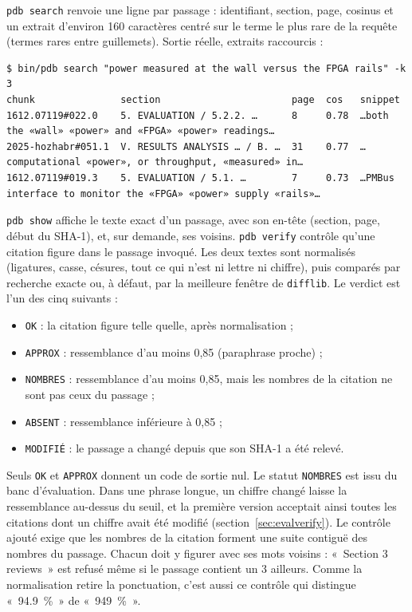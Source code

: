 \documentclass[11pt,a4paper]{article}
\newcommand{\cmd}[1]{\texttt{#1}}
\begin{document}
\cmd{pdb search} renvoie une ligne par passage : identifiant, section, page, cosinus et un
extrait d'environ 160 caractères centré sur le terme le plus rare de la requête (termes
rares entre guillemets). Sortie réelle, extraits raccourcis :

\begin{lstlisting}
$ bin/pdb search "power measured at the wall versus the FPGA rails" -k 3
chunk               section                       page  cos   snippet
1612.07119#022.0    5. EVALUATION / 5.2.2. …      8     0.78  …both the «wall» «power» and «FPGA» «power» readings…
2025-hozhabr#051.1  V. RESULTS ANALYSIS … / B. …  31    0.77  …computational «power», or throughput, «measured» in…
1612.07119#019.3    5. EVALUATION / 5.1. …        7     0.73  …PMBus interface to monitor the «FPGA» «power» supply «rails»…
\end{lstlisting}

\cmd{pdb show} affiche le texte exact d'un passage, avec son en-tête (section, page, début
du SHA-1), et, sur demande, ses voisins. \cmd{pdb verify} contrôle qu'une citation figure
dans le passage invoqué. Les deux textes sont normalisés (ligatures, casse, césures, tout ce
qui n'est ni lettre ni chiffre), puis comparés par recherche exacte ou, à défaut, par la
meilleure fenêtre de \cmd{difflib}. Le verdict est l'un des cinq suivants :
\begin{itemize}
  \item \cmd{OK} : la citation figure telle quelle, après normalisation ;
  \item \cmd{APPROX} : ressemblance d'au moins 0,85 (paraphrase proche) ;
  \item \cmd{NOMBRES} : ressemblance d'au moins 0,85, mais les nombres de la citation ne
    sont pas ceux du passage ;
  \item \cmd{ABSENT} : ressemblance inférieure à 0,85 ;
  \item \cmd{MODIFIÉ} : le passage a changé depuis que son SHA-1 a été relevé.
\end{itemize}
Seuls \cmd{OK} et \cmd{APPROX} donnent un code de sortie nul. Le statut \cmd{NOMBRES} est
issu du banc d'évaluation. Dans une phrase longue, un chiffre changé laisse la
ressemblance au-dessus du seuil, et la première version acceptait ainsi toutes les
citations dont un chiffre avait été modifié (section~\ref{sec:evalverify}). Le contrôle
ajouté exige que les nombres de la citation forment une suite contiguë des nombres du
passage. Chacun doit y figurer avec ses mots voisins : «~Section 3 reviews~» est refusé
même si le passage contient un 3 ailleurs. Comme la normalisation retire la ponctuation,
c'est aussi ce contrôle qui distingue «~94.9~\%~» de «~949~\%~».
\end{document}
